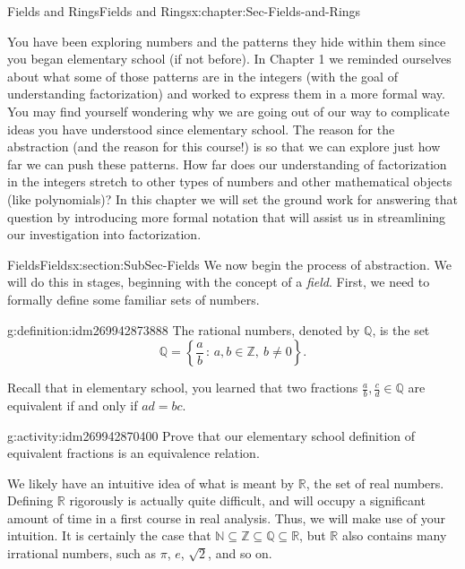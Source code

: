 \documentclass[oneside,10pt,]{book}
\numberwithin{equation}{section}
\newcommand{\setof}[2]{{\left\{#1\,\colon\,#2\right\}}}
\def\Z{{\mathbb Z}}
\def\Q{{\mathbb Q}}
\def\N{{\mathbb N}}
\def\R{{\mathbb R}}
\begin{document}
\begin{chapterptx}{Fields and Rings}{}{Fields and Rings}{}{}{x:chapter:Sec-Fields-and-Rings}
\begin{introduction}{}%
You have been exploring numbers and the patterns they hide within them since you began elementary school (if not before). In Chapter 1 we reminded ourselves about what some of those patterns are in the integers (with the goal of understanding factorization) and worked to express them in a more formal way. You may find yourself wondering why we are going out of our way to complicate ideas you have understood since elementary school. The reason for the abstraction (and the reason for this course!) is so that we can explore just how far we can push these patterns. How far does our understanding of factorization in the integers stretch to other types of numbers and other mathematical objects (like polynomials)? In this chapter we will set the ground work for answering that question by introducing more formal notation that will assist us in streamlining our investigation into factorization.%
\end{introduction}%
%
%
\typeout{************************************************}
\typeout{************************************************}
%
\begin{sectionptx}{Fields}{}{Fields}{}{}{x:section:SubSec-Fields}
We now begin the process of abstraction. We will do this in stages, beginning with the concept of a \emph{field}. First, we need to formally define some familiar sets of numbers.%
\begin{definition}{}{g:definition:idm269942873888}%
The rational numbers, denoted by \(\Q\), is the set%
\begin{equation*}
\Q = \setof{\frac{a}{b}}{a,b\in \Z, \ b\ne 0}\text{.}
\end{equation*}
%
\end{definition}
Recall that in elementary school, you learned that two fractions \(\frac{a}{b}, \frac{c}{d} \in \Q\) are equivalent if and only if \(ad=bc\).%
\begin{activity}{}{g:activity:idm269942870400}%
Prove that our elementary school definition of equivalent fractions is an equivalence relation.%
\end{activity}
We likely have an intuitive idea of what is meant by \(\R\), the set of real numbers. Defining \(\R\) rigorously is actually quite difficult, and will occupy a significant amount of time in a first course in real analysis. Thus, we will make use of your intuition. It is certainly the case that \(\N\subseteq \Z\subseteq \Q\subseteq \R\), but \(\R\) also contains many irrational numbers, such as \(\pi\), \(e\), \(\sqrt{2}\), and so on.%

\end{sectionptx}
\end{chapterptx}
\end{document}
